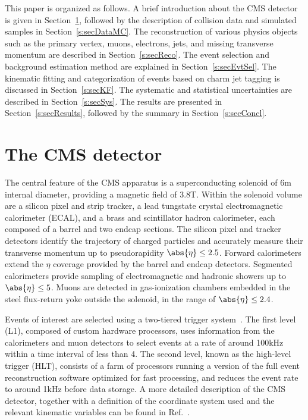 This paper is organized as follows. A brief introduction about the CMS
detector is given in Section~\ref{s:secCMS}, followed by the description
of collision data and simulated samples in Section~\ref{s:secDataMC}.
The reconstruction of various physics objects such as the primary 
vertex, muons, electrons, jets, and missing transverse momentum are 
described in Section~\ref{s:secReco}. The event selection and 
background estimation method are explained in Section~\ref{s:secEvtSel}. 
The kinematic fitting and categorization of events based on charm jet 
tagging is discussed in Section~\ref{s:secKF}. The systematic and 
statistical uncertainties are described in Section~\ref{s:secSys}. The 
results are presented in Section~\ref{s:secResults}, followed by the 
summary in Section~\ref{s:secConcl}.

\section{The CMS detector}
\label{s:secCMS}
The central feature of the CMS apparatus is a superconducting solenoid
of 6\unit{m} internal diameter, providing a magnetic field of
3.8\unit{T}. Within the solenoid volume are a silicon pixel and strip
tracker, a lead tungstate crystal electromagnetic calorimeter (ECAL),
and a brass and scintillator hadron calorimeter, each composed
of a barrel and two endcap sections. The silicon pixel and tracker
detectors identify the trajectory of charged particles and accurately
measure their transverse momentum \pt up to pseudorapidity $\abs{\eta} \leq 2.5$.  Forward
calorimeters extend the $\eta$ coverage provided by the barrel
and endcap detectors. Segmented calorimeters provide sampling of
electromagnetic and hadronic showers up to $\abs{\eta} \leq 5$. Muons are
detected in gas-ionization chambers embedded in the steel flux-return
yoke outside the solenoid, in the range of $\abs{\eta} \leq 2.4$. 

Events of interest are selected using a two-tiered trigger
system~\cite{Khachatryan:2016bia}. The first level (L1), composed of
custom hardware processors, uses information from the calorimeters and
muon detectors to select events at a rate of around 100\unit{kHz}
within a time interval of less than 4\mus. The second level, known as
the high-level trigger (HLT), consists of a farm of processors running
a version of the full event reconstruction software optimized for fast
processing, and reduces the event rate to around 1\unit{kHz} before
data storage. A more detailed description of the CMS detector,
together with a definition of the coordinate system used and the
relevant kinematic variables can be found in Ref.~\cite{Chatrchyan:2008zzk}.

